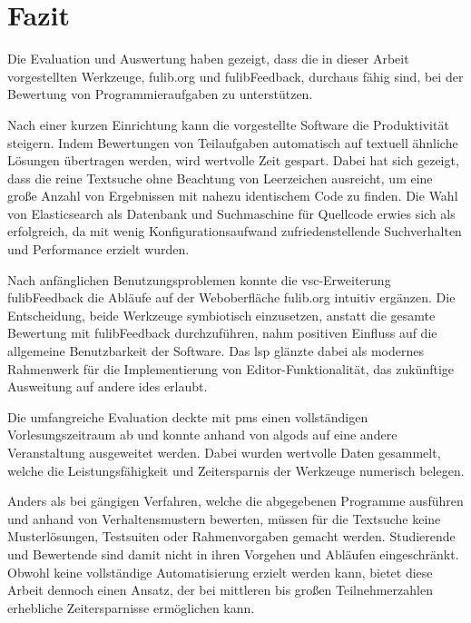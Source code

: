 \chapter{Fazit}\label{ch:conclusion}

Die Evaluation und Auswertung haben gezeigt, dass die in dieser Arbeit vorgestellten Werkzeuge, fulib.org und fulibFeedback, durchaus fähig sind, bei der Bewertung von Programmieraufgaben zu unterstützen.

Nach einer kurzen Einrichtung kann die vorgestellte Software die Produktivität steigern.
Indem Bewertungen von Teilaufgaben automatisch auf textuell ähnliche Lösungen übertragen werden, wird wertvolle Zeit gespart.
Dabei hat sich gezeigt, dass die reine Textsuche ohne Beachtung von Leerzeichen ausreicht, um eine große Anzahl von Ergebnissen mit nahezu identischem Code zu finden.
Die Wahl von Elasticsearch als Datenbank und Suchmaschine für Quellcode erwies sich als erfolgreich, da mit wenig Konfigurationsaufwand zufriedenstellende Suchverhalten und Performance erzielt wurden.

Nach anfänglichen Benutzungsproblemen konnte die \ac{vsc}-Erweiterung fulibFeedback die Abläufe auf der Weboberfläche fulib.org intuitiv ergänzen.
Die Entscheidung, beide Werkzeuge symbiotisch einzusetzen, anstatt die gesamte Bewertung mit fulibFeedback durchzuführen, nahm positiven Einfluss auf die allgemeine Benutzbarkeit der Software.
Das \acl{lsp} glänzte dabei als modernes Rahmenwerk für die Implementierung von Editor-Funktionalität, das zukünftige Ausweitung auf andere \acp{ide} erlaubt.

Die umfangreiche Evaluation deckte mit \acp{pm} einen vollständigen Vorlesungszeitraum ab und konnte anhand von \acl{algods} auf eine andere Veranstaltung ausgeweitet werden.
Dabei wurden wertvolle Daten gesammelt, welche die Leistungsfähigkeit und Zeitersparnis der Werkzeuge numerisch belegen.

Anders als bei gängigen Verfahren, welche die abgegebenen Programme ausführen und anhand von Verhaltensmustern bewerten, müssen für die Textsuche keine Musterlösungen, Testsuiten oder Rahmenvorgaben gemacht werden.
Studierende und Bewertende sind damit nicht in ihren Vorgehen und Abläufen eingeschränkt.
Obwohl keine vollständige Automatisierung erzielt werden kann, bietet diese Arbeit dennoch einen Ansatz, der bei mittleren bis großen Teilnehmerzahlen erhebliche Zeitersparnisse ermöglichen kann.
